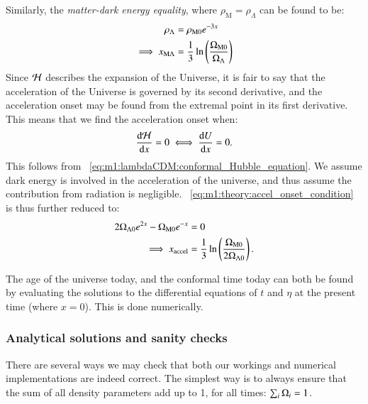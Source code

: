      Similarly, the \textit{matter-dark energy equality}, where $\rho_\mathrm{M}=\rho_\Lambda$ can be found to be:
     \begin{equation}\label{eq:m1:theory:equalities:matter_dark_energy}
        \begin{split}
            \rho_\Lambda &= \rho_\mathrm{M0}e^{-3x} \\
            \implies x_{\mathrm{M}\Lambda} &= \frac{1}{3}\ln\left(\frac{\Omega_\mathrm{M0}}{\Omega_\Lambda}\right)
        \end{split}
     \end{equation}
     Since $\mathcal{H}$ describes the expansion of the Universe, it is fair to say that the acceleration of the Universe is governed by its second derivative, and the acceleration onset may be found from the extremal point in its first derivative. This means that we find the acceleration onset when:
     \begin{equation}\label{eq:m1:theory:accel_onset_condition}
        \dv{\mathcal{H}}{x} = 0 \iff \dv{U}{x} = 0.
     \end{equation}
     This follows from ~\cref{eq:m1:lambdaCDM:conformal_Hubble_equation}. We assume dark energy is involved in the acceleration of the universe, and thus assume the contribution from radiation is negligible. ~\cref{eq:m1:theory:accel_onset_condition} is thus further reduced to:
     \begin{equation}\label{eq:m1:theory:accel_onset_definiton}
        \begin{split}
            2\Omega_{\Lambda0}e^{2x} - \Omega_\mathrm{M0}e^{-x}&=0\\
            \implies x_\mathrm{accel}&=\frac{1}{3}\ln\left(\frac{\Omega_\mathrm{M0}}{2\Omega_{\Lambda0}}\right).
        \end{split}
     \end{equation}
    
    The age of the universe today, and the conformal time today can both be found by evaluating the solutions to the differential equations of $t$ and $\eta$ at the present time (where $x=0$). This is done numerically. 
\subsubsection{Analytical solutions and sanity checks}\label{sec:m1:theory:sanity}
    There are several ways we may check that both our workings and numerical implementations are indeed correct. The simplest way is to always ensure that the sum of all density parameters add up to 1, for all times: $\sum_i\Omega_i=1$. 
    

